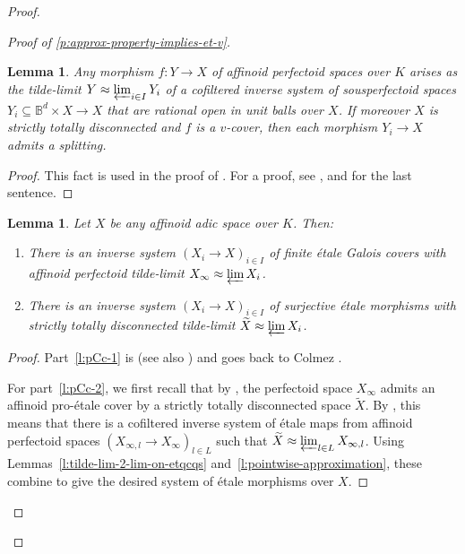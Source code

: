 \documentclass[10pt,a4paper]{article}
\newtheorem{Lemma}[thm]{Lemma}
\theoremstyle{definition}
\theoremstyle{remark}
\newcommand{\B}{\mathbb{B}}
\newcommand{\wt}{\widetilde}
\numberwithin{equation}{section}
\begin{document}
\begin{proof}
\begin{proof}[Proof of \cref{p:approx-property-implies-et-v}]
                \begin{Lemma}\label{l:v-cover-approximate-by-balls}
			 Any morphism $f\colon Y\to X$ of affinoid perfectoid spaces over $K$ arises as the tilde-limit $Y\approx\varprojlim_{i\in I} Y_i$ of a cofiltered inverse system of sousperfectoid spaces $Y_i\subseteq \B^{d}\times X\to X$ that are rational open in unit balls over $X$. If moreover $X$ is strictly totally disconnected and $f$ is a $v$-cover, then each morphism $Y_i\to X$ admits a splitting.
		\end{Lemma}

                \begin{proof}
			This fact is used in the proof of \cite[Proposition 14.7]{etale-cohomology-of-diamonds}. For a proof, see \cite[Proposition~3.17]{heuer-diamantine-Picard}, and \cite[Lemma~2.23]{heuer-Picard-good-reduction} for the last sentence.
		\end{proof}

                \begin{Lemma}\label{l:proet-Colmez-cover}
		Let $X$ be any affinoid adic space over $K$. Then:
		\begin{enumerate}
			\item\label{l:pCc-1} There is an inverse system $(X_i\to X)_{i\in I}$ of finite \'etale Galois covers with affinoid perfectoid tilde-limit $X_\infty\approx \varprojlim X_i$. 
			\item\label{l:pCc-2} There is an inverse system $(X_i\to X)_{i\in I}$ of surjective \'etale morphisms with strictly totally disconnected tilde-limit $\wt X\approx \varprojlim X_i$.
		\end{enumerate}
		
		\end{Lemma}

                \begin{proof}
		Part~\eqref{l:pCc-1} is \cite[Lemma 10.1.6--7]{ScholzeWeinstein} (see also \cite[Lemma 15.3, Proposition 15.4]{etale-cohomology-of-diamonds}) and goes back to Colmez \cite[Section~4]{Colmez-espacesdeBanach}. 
		
		For part~\eqref{l:pCc-2}, we first recall that by \cite[Lemma 7.18]{etale-cohomology-of-diamonds}, the perfectoid space $X_\infty$ admits an affinoid pro-\'etale cover by a strictly totally disconnected space $\wt X$. By  \cite[Proposition~6.5]{etale-cohomology-of-diamonds}, this means that there is a cofiltered inverse system of  \'etale maps from affinoid perfectoid spaces $(X_{\infty,l}\to X_\infty)_{l\in L}$ such that $\wt X\approx \varprojlim_{l\in L} X_{\infty,l}$. Using Lemmas~\ref{l:tilde-lim-2-lim-on-etqcqs} and~\ref{l:pointwise-approximation}, these combine to give the desired system of \'etale morphisms over $X$. 
	        \end{proof}
                

\end{proof}
\end{proof}
\end{document}
